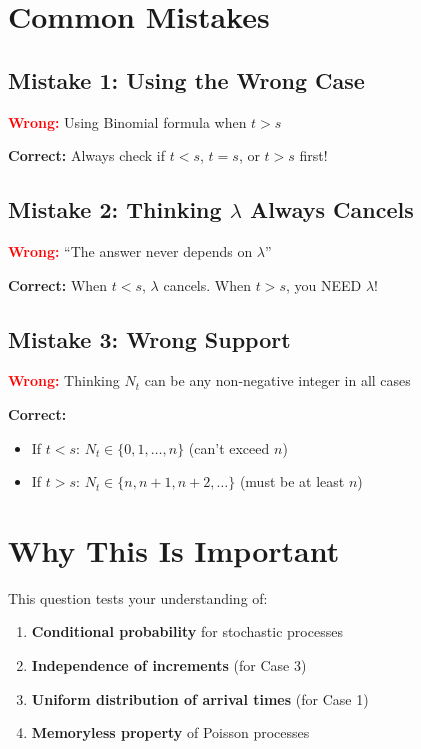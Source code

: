 \documentclass[11pt]{article}
\begin{document}
\section{Common Mistakes}

\subsection{Mistake 1: Using the Wrong Case}

\textcolor{red}{\textbf{Wrong:}} Using Binomial formula when $t > s$

\textcolor{green!60!black}{\textbf{Correct:}} Always check if $t < s$, $t = s$, or $t > s$ first!

\subsection{Mistake 2: Thinking $\lambda$ Always Cancels}

\textcolor{red}{\textbf{Wrong:}} ``The answer never depends on $\lambda$''

\textcolor{green!60!black}{\textbf{Correct:}} When $t < s$, $\lambda$ cancels. When $t > s$, you NEED $\lambda$!

\subsection{Mistake 3: Wrong Support}

\textcolor{red}{\textbf{Wrong:}} Thinking $N_t$ can be any non-negative integer in all cases

\textcolor{green!60!black}{\textbf{Correct:}}
\begin{itemize}
    \item If $t < s$: $N_t \in \{0, 1, \ldots, n\}$ (can't exceed $n$)
    \item If $t > s$: $N_t \in \{n, n+1, n+2, \ldots\}$ (must be at least $n$)
\end{itemize}

\section{Why This Is Important}

This question tests your understanding of:
\begin{enumerate}
    \item \textbf{Conditional probability} for stochastic processes
    \item \textbf{Independence of increments} (for Case 3)
    \item \textbf{Uniform distribution of arrival times} (for Case 1)
    \item \textbf{Memoryless property} of Poisson processes
\end{enumerate}
\end{document}
